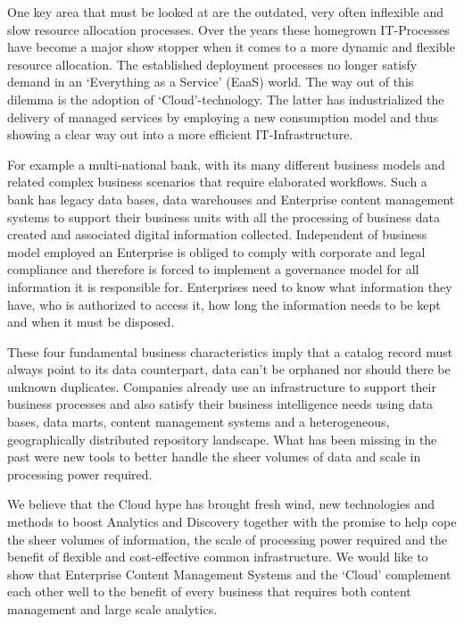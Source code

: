 One key area that must be looked at are the outdated, very often inflexible and slow resource allocation processes. Over the years these homegrown IT-Processes have become a major show stopper when it comes to a more dynamic and flexible resource allocation. The established deployment processes no longer satisfy demand in an ‘Everything as a Service’ (EaaS) world. The way out of this dilemma is the adoption of ‘Cloud’-technology. The latter has industrialized the delivery of managed services by employing a new consumption model and thus showing a clear way out into a more efficient IT-Infrastructure.

For example a multi-national bank, with its many different business models and related complex business scenarios that require elaborated workflows. Such a bank has legacy data bases, data warehouses and Enterprise content management systems to support their business units with all the processing of business data created and associated digital information collected. Independent of business model employed an Enterprise is obliged to comply with corporate and legal compliance and therefore is forced to implement a governance model for all information it is responsible for. Enterprises need to know what information they have, who is authorized to access it, how long the information needs to be kept and when it must be disposed. 

These four fundamental business characteristics imply that a catalog record must always point to its data counterpart, data can’t be orphaned nor should there be unknown duplicates. Companies already use an infrastructure to support their business processes and also satisfy their business intelligence needs using data bases, data marts, content management systems and a heterogeneous, geographically distributed repository landscape. What has been missing in the past were new tools to better handle the sheer volumes of data and scale in processing power required.   
 
We believe that the Cloud hype has brought fresh wind, new technologies and methods to boost Analytics and Discovery together with the promise to help cope the sheer volumes of information, the scale of processing power required and the benefit of flexible and cost-effective common infrastructure. We would like to show that Enterprise Content Management Systems and the ‘Cloud’ complement each other well to the benefit of every business that requires both content management and large scale analytics.




